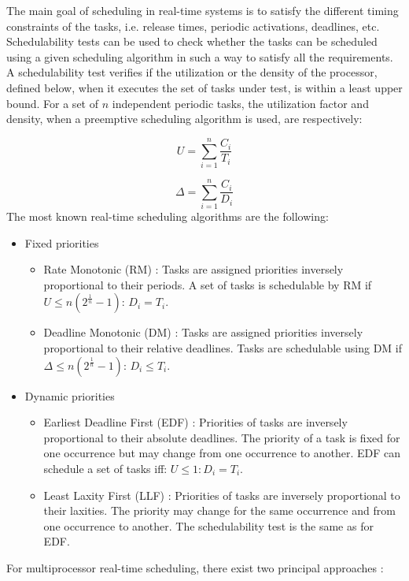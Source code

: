 The main goal of scheduling in real-time systems is to satisfy the different timing constraints of the tasks, i.e. release times, periodic activations, deadlines, etc. Schedulability tests can be used to check whether the tasks can be scheduled using a given scheduling algorithm in such a way to satisfy all the requirements. A schedulability test verifies if the utilization or the density of the processor, defined below, when it executes the set of tasks under test, is within a least upper bound. For a set of $n$ independent periodic tasks, the utilization factor and density, when a preemptive scheduling algorithm is used, are respectively:

\begin{equation}
U = \sum_{i=1}^{n}\frac{C_i}{T_i}
\end{equation}

\begin{equation}
\Delta = \sum_{i=1}^{n}\frac{C_i}{D_i}
\end{equation}
The most known real-time scheduling algorithms are the following:

\begin{itemize}
\item Fixed priorities
\begin{itemize}
\item Rate Monotonic (RM) \cite{liu:1973}: Tasks are assigned priorities inversely proportional to their periods. A set of tasks is schedulable by RM if $U \leq n(2^{\frac{1}{n}}-1)$: $D_i = T_i$. 
\item Deadline Monotonic (DM) \cite{leung:1982}: Tasks are assigned priorities inversely proportional to their relative deadlines. Tasks are schedulable using DM if $\Delta \leq n(2^{\frac{1}{n}}-1)$: $D_i \leq T_i$. 
\end{itemize}
\item Dynamic priorities
\begin{itemize}
\item Earliest Deadline First (EDF) \cite{liu:1973}: Priorities of tasks are inversely proportional to their absolute deadlines. The priority of a task is fixed for one occurrence but may change from one occurrence to another. EDF can schedule a set of tasks iff: $U \leq 1: D_i = T_i$.
\item Least Laxity First (LLF) \cite{mok:1983}: Priorities of tasks are inversely proportional to their laxities. The priority may change for the same occurrence and from one occurrence to another. The schedulability test is the same as for EDF.
\end{itemize}
\end{itemize}
 For multiprocessor real-time scheduling, there exist two principal approaches \cite{andersson:2000}:

